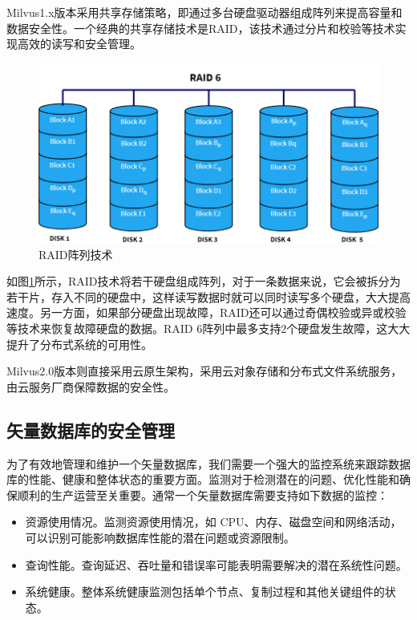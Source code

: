 Milvus1.x版本采用共享存储策略，即通过多台硬盘驱动器组成阵列来提高容量和数据安全性。一个经典的共享存储技术是RAID\cite{chen1994raid}，该技术通过分片和校验等技术实现高效的读写和安全管理。

\begin{figure}[H]
    \includegraphics[width=\textwidth]{examples/raid.png}
    \centering
    \caption{RAID阵列技术}
    \label{fig:raid}
\end{figure}

如图\ref{fig:raid}所示，RAID技术将若干硬盘组成阵列，对于一条数据来说，它会被拆分为若干片，存入不同的硬盘中，这样读写数据时就可以同时读写多个硬盘，大大提高速度。另一方面，如果部分硬盘出现故障，RAID还可以通过奇偶校验\cite{gallager1962low}或异或校验等技术来恢复故障硬盘的数据。RAID 6阵列中最多支持2个硬盘发生故障，这大大提升了分布式系统的可用性。

Milvus2.0版本则直接采用云原生架构，采用云对象存储和分布式文件系统服务，由云服务厂商保障数据的安全性。

\subsection{矢量数据库的安全管理}

为了有效地管理和维护一个矢量数据库，我们需要一个强大的监控系统来跟踪数据库的性能、健康和整体状态的重要方面。监测对于检测潜在的问题、优化性能和确保顺利的生产运营至关重要。通常一个矢量数据库需要支持如下数据的监控：

\begin{itemize}
    \item 资源使用情况。监测资源使用情况，如 CPU、内存、磁盘空间和网络活动，可以识别可能影响数据库性能的潜在问题或资源限制。
    \item 查询性能。查询延迟、吞吐量和错误率可能表明需要解决的潜在系统性问题。
    \item 系统健康。整体系统健康监测包括单个节点、复制过程和其他关键组件的状态。
\end{itemize}

